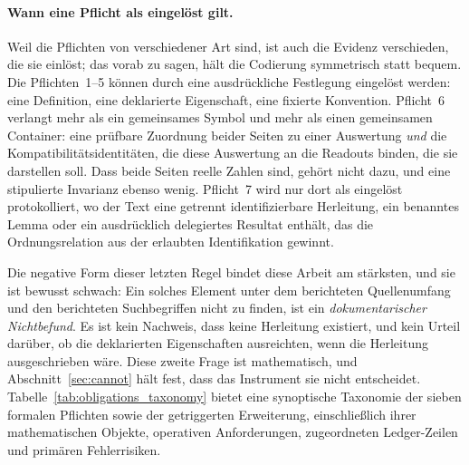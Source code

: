 \documentclass[11pt,a4paper]{article}
\theoremstyle{definition}
\begin{document}
\paragraph{Wann eine Pflicht als eingelöst gilt.} Weil die Pflichten von
verschiedener Art sind, ist auch die Evidenz verschieden, die sie einlöst; das
vorab zu sagen, hält die Codierung symmetrisch statt bequem. Die Pflichten~1--5
können durch eine ausdrückliche Festlegung eingelöst werden: eine Definition, eine
deklarierte Eigenschaft, eine fixierte Konvention. Pflicht~6 verlangt mehr als ein
gemeinsames Symbol und mehr als einen gemeinsamen Container: eine prüfbare
Zuordnung beider Seiten zu einer Auswertung \emph{und} die
Kompatibilitätsidentitäten, die diese Auswertung an die Readouts binden, die sie
darstellen soll. Dass beide Seiten reelle Zahlen sind, gehört nicht dazu, und
eine stipulierte Invarianz ebenso wenig. Pflicht~7 wird nur dort
als eingelöst protokolliert, wo der Text eine getrennt identifizierbare Herleitung,
ein benanntes Lemma oder ein ausdrücklich delegiertes Resultat enthält, das die
Ordnungsrelation aus der erlaubten Identifikation gewinnt.

Die negative Form dieser letzten Regel bindet diese Arbeit am stärksten, und sie
ist bewusst schwach: Ein solches Element unter dem berichteten Quellenumfang und
den berichteten Suchbegriffen nicht zu finden, ist ein \emph{dokumentarischer
Nichtbefund}. Es ist kein Nachweis, dass keine Herleitung existiert, und kein
Urteil darüber, ob die deklarierten Eigenschaften ausreichten, wenn die Herleitung
ausgeschrieben wäre. Diese zweite Frage ist mathematisch, und
Abschnitt~\ref{sec:cannot} hält fest, dass das Instrument sie nicht entscheidet. Tabelle~\ref{tab:obligations_taxonomy} bietet eine synoptische Taxonomie der sieben formalen Pflichten sowie der getriggerten Erweiterung, einschließlich ihrer mathematischen Objekte, operativen Anforderungen, zugeordneten Ledger-Zeilen und primären Fehlerrisiken.
\end{document}
